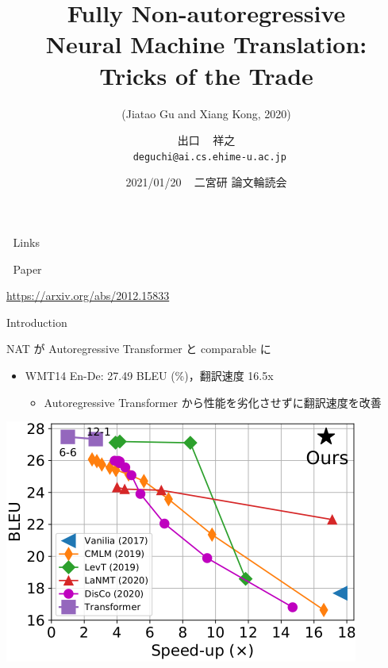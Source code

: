 \documentclass[unicode, 12pt, xdvipdfmx, aspectratio=43]{beamer}
\author{出口 ~ 祥之 \\ \lower2.0pt\hbox{\materials} \texttt{deguchi@ai.cs.ehime-u.ac.jp}}
\date{2021/01/20 ~ 二宮研 論文輪読会}
\title{Fully Non-autoregressive \\ Neural Machine Translation: \\ Tricks of the Trade}
\subtitle{(Jiatao Gu and Xiang Kong, 2020)}
\institute{}
\begin{document}
\maketitle

\begin{frame}[label={sec:orgb065a1d}]{\hbox{\octicons} Links}
\begin{block}{\hbox{\octicons} Paper}
\begin{block}{\url{https://arxiv.org/abs/2012.15833}}
\end{block}
\end{block}
\end{frame}
\begin{frame}[label={sec:org8e2dbed}]{Introduction}
\begin{block}{NAT が Autoregressive Transformer と comparable に}
\begin{itemize}
\item WMT14 En-De: 27.49 BLEU (\%)，翻訳速度 16.5x
\begin{itemize}
\item Autoregressive Transformer から性能を劣化させずに翻訳速度を改善
\end{itemize}
\end{itemize}

\begin{center}
\includegraphics[width=0.6\linewidth]{./figure/Figure1.pdf}
\end{center}
\end{block}
\end{frame}
\end{document}
